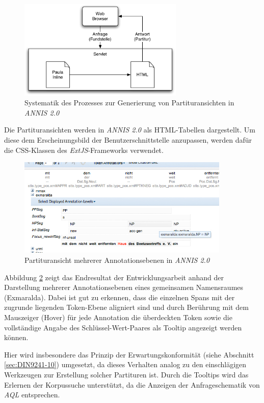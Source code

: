 \begin{figure}[H]
	\centering
	\includegraphics*[width=0.70\textwidth]{figures/DA/PartiturProzess}
	\caption{Systematik des Prozesses zur Generierung von Partituransichten in \emph{ANNIS 2.0}}\label{fig:PartiturProzess}
\end{figure}

Die Partituransichten werden in \emph{ANNIS 2.0} als HTML-Tabellen dargestellt. Um diese dem Erscheinungsbild der Benutzerschnittstelle anzupassen, werden dafür die CSS-Klassen des \emph{ExtJS}-Frameworks verwendet. 

\begin{figure}[H]
	\centering
	\includegraphics*[width=0.9\textwidth]{figures/DA/ScreenshotPartitur.jpg}
	\caption{Partituransicht mehrerer Annotationsebenen in \emph{ANNIS 2.0}}\label{fig:PartiturScreenshot}
\end{figure}

Abbildung \ref{fig:PartiturScreenshot} zeigt das Endresultat der Entwicklungsarbeit anhand der Darstellung mehrerer Annotationsebenen eines gemeinsamen Namensraumes (Exmaralda). Dabei ist gut zu erkennen, dass die einzelnen Spans mit der zugrunde liegenden Token-Ebene aligniert sind und durch Berührung mit dem Mauszeiger (Hover) für jede Annotation die überdeckten Token sowie die vollständige Angabe des Schlüssel-Wert-Paares als Tooltip angezeigt werden können.

Hier wird insbesondere das Prinzip der Erwartungskonformität (siehe Abschnitt \ref{sec:DIN9241-10}) umgesetzt, da dieses Verhalten analog zu den einschlägigen Werkzeugen zur Erstellung solcher Partituren ist. Durch die Tooltips wird das Erlernen der Korpussuche unterstützt, da die Anzeigen der Anfrageschematik von \emph{AQL} entsprechen.

